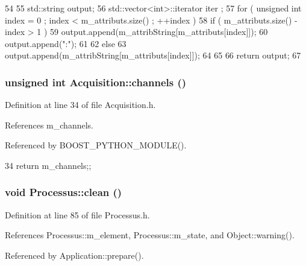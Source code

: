 \begin{DoxyCode}
54                             {
55   std::string output;
56   std::vector<int>::iterator iter ;
57   for ( unsigned int index = 0 ; index < m_attributs.size() ; ++index ) {
58     if ( m_attributs.size() - index > 1 ) {
59       output.append(m_attribString[m_attributs[index]]);
60       output.append(":");
61     }
62     else {
63       output.append(m_attribString[m_attributs[index]]);
64     }
65   }
66   return output;
67 }
\end{DoxyCode}
\hypertarget{classAcquisition_a3041537afcb4dfe5c6940f0ef6829265}{
\subsubsection[{channels}]{\setlength{\rightskip}{0pt plus 5cm}unsigned int Acquisition::channels ()}}
\label{classAcquisition_a3041537afcb4dfe5c6940f0ef6829265}


Definition at line 34 of file Acquisition.h.

References m\_\-channels.

Referenced by BOOST\_\-PYTHON\_\-MODULE().


\begin{DoxyCode}
34 {return m_channels;};
\end{DoxyCode}
\hypertarget{classProcessus_aaeb17673b98d2b39f3aa780e335e0968}{
\subsubsection[{clean}]{\setlength{\rightskip}{0pt plus 5cm}void Processus::clean ()}}
\label{classProcessus_aaeb17673b98d2b39f3aa780e335e0968}


Definition at line 85 of file Processus.h.

References Processus::m\_\-element, Processus::m\_\-state, and Object::warning().

Referenced by Application::prepare().


